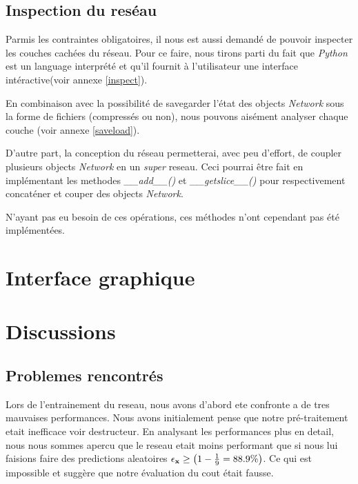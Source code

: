 \documentclass[11pt]{article}
\begin{document}
\subsection{Inspection du res\'eau}
Parmis les contraintes obligatoires, il nous est aussi demand\'e de pouvoir
inspecter les couches cach\'ees du r\'eseau. Pour ce faire, nous tirons parti du
fait que {\em Python} est un language interpr\'et\'e et qu'il fournit \`a
l'utilisateur une interface int\'eractive(voir annexe \ref{inspect}).

En combinaison avec la possibilit\'e de savegarder l'\'etat des
objects {\em Network} sous la forme de fichiers (compress\'es ou non), nous
pouvons ais\'ement analyser chaque couche (voir annexe \ref{saveload}).

D'autre part, la conception du r\'eseau permetterai, avec peu d'effort, de coupler
plusieurs objects {\em Network} en un {\em super} reseau.
Ceci pourrai \^etre fait en impl\'ementant les methodes {\em \_\_add\_\_()}
et {\em \_\_getslice\_\_()} pour respectivement concat\'ener et couper des objects
{\em Network}.

N'ayant pas eu besoin de ces op\'erations, ces m\'ethodes n'ont
cependant pas \'et\'e impl\'ement\'ees.

\section{Interface graphique}



\section{Discussions}
\subsection{Problemes rencontr\'es}
Lors de l'entrainement du reseau, nous avons d'abord ete confronte a de tres
mauvaises performances. Nous avons initialement pense que notre pr\'e-traitement
etait inefficace voir destructeur. En analysant les performances plus en detail,
nous nous sommes apercu que le reseau etait moins performant que si nous lui
faisions faire des predictions aleatoires
$\epsilon_{\bf x} \ge \left (1 - \frac{1}{9} = 88.9\% \right)$.
Ce qui est impossible et sugg\`ere que notre \'evaluation du cout \'etait fausse.
\end{document}
